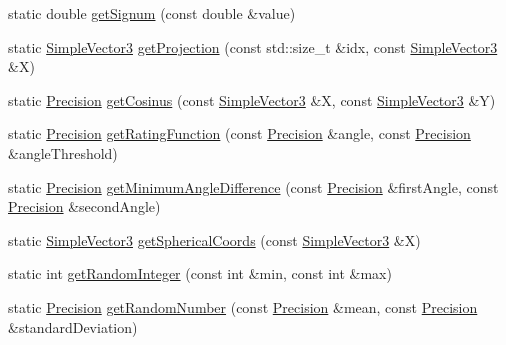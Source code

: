 \begin{DoxyCompactItemize}
\item 
static double \hyperlink{classnext__best__view_1_1MathHelper_a3ef48e4c8b0f27beae7e62f046b3828d}{get\-Signum} (const double \&value)
\item 
static \hyperlink{namespacenext__best__view_a59fc75b908e198bc02a9b19ba88edf12}{\-Simple\-Vector3} \hyperlink{classnext__best__view_1_1MathHelper_a3117b22fe7e898ea8f24f46c1374a068}{get\-Projection} (const std\-::size\-\_\-t \&idx, const \hyperlink{namespacenext__best__view_a59fc75b908e198bc02a9b19ba88edf12}{\-Simple\-Vector3} \&\-X)
\item 
static \hyperlink{namespacenext__best__view_a471681a7c47e921eda8b6b1ba32b1786}{\-Precision} \hyperlink{classnext__best__view_1_1MathHelper_abf60e11cdcd94fc3c8cfdc3703dec8c2}{get\-Cosinus} (const \hyperlink{namespacenext__best__view_a59fc75b908e198bc02a9b19ba88edf12}{\-Simple\-Vector3} \&\-X, const \hyperlink{namespacenext__best__view_a59fc75b908e198bc02a9b19ba88edf12}{\-Simple\-Vector3} \&\-Y)
\item 
static \hyperlink{namespacenext__best__view_a471681a7c47e921eda8b6b1ba32b1786}{\-Precision} \hyperlink{classnext__best__view_1_1MathHelper_a8aa455633d7293b9529942ab8f0adb72}{get\-Rating\-Function} (const \hyperlink{namespacenext__best__view_a471681a7c47e921eda8b6b1ba32b1786}{\-Precision} \&angle, const \hyperlink{namespacenext__best__view_a471681a7c47e921eda8b6b1ba32b1786}{\-Precision} \&angle\-Threshold)
\item 
static \hyperlink{namespacenext__best__view_a471681a7c47e921eda8b6b1ba32b1786}{\-Precision} \hyperlink{classnext__best__view_1_1MathHelper_ad6294462360ed20c462eed83ee562636}{get\-Minimum\-Angle\-Difference} (const \hyperlink{namespacenext__best__view_a471681a7c47e921eda8b6b1ba32b1786}{\-Precision} \&first\-Angle, const \hyperlink{namespacenext__best__view_a471681a7c47e921eda8b6b1ba32b1786}{\-Precision} \&second\-Angle)
\item 
static \hyperlink{namespacenext__best__view_a59fc75b908e198bc02a9b19ba88edf12}{\-Simple\-Vector3} \hyperlink{classnext__best__view_1_1MathHelper_ac717ce33d456b93614a470463a6c469b}{get\-Spherical\-Coords} (const \hyperlink{namespacenext__best__view_a59fc75b908e198bc02a9b19ba88edf12}{\-Simple\-Vector3} \&\-X)
\item 
static int \hyperlink{classnext__best__view_1_1MathHelper_a474413a46b457e5755dd7a24d0ab5570}{get\-Random\-Integer} (const int \&min, const int \&max)
\item 
static \hyperlink{namespacenext__best__view_a471681a7c47e921eda8b6b1ba32b1786}{\-Precision} \hyperlink{classnext__best__view_1_1MathHelper_a0fb767f648a717e6e593de84c85996a8}{get\-Random\-Number} (const \hyperlink{namespacenext__best__view_a471681a7c47e921eda8b6b1ba32b1786}{\-Precision} \&mean, const \hyperlink{namespacenext__best__view_a471681a7c47e921eda8b6b1ba32b1786}{\-Precision} \&standard\-Deviation)

\end{DoxyCompactItemize}
